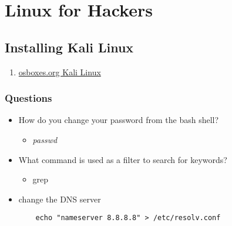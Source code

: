 \documentclass[12pt,letterpaper]{article}
\begin{document}
\section{Linux for Hackers}
\subsection{Installing Kali Linux} 
\begin{enumerate}
    \item \href{https://www.osboxes.org/kali-linux/}{osboxes.org Kali Linux}
\end{enumerate}
\subsubsection{Questions}
\begin{itemize}
    \item How do you change your password from the bash shell? 
    \begin{itemize}
        \item \textit{passwd}
    \end{itemize}
    \item What command is used as a filter to search for keywords? 
    \begin{itemize}
        \item grep
    \end{itemize}
    \item change the DNS server 
    \begin{lstlisting}
    echo "nameserver 8.8.8.8" > /etc/resolv.conf
    \end{lstlisting}
\end{itemize}
\end{document}

